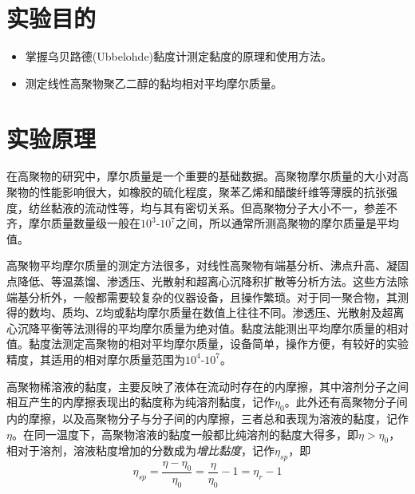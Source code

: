 \documentclass[12pt,hyperref,a4paper,UTF8]{ctexart}
\begin{document}
\cover

%
%

\thispagestyle{empty} %

\newpage
\tableofcontents

\newpage


\section{实验目的}
\begin{itemize}
    \item 掌握乌贝路德(Ubbelohde)黏度计测定黏度的原理和使用方法。
    \item 测定线性高聚物聚乙二醇的黏均相对平均摩尔质量。
\end{itemize}


\section{实验原理}
在高聚物的研究中，摩尔质量是一个重要的基础数据。高聚物摩尔质量的大小对高聚物的性能影响很大，如橡胶的硫化程度，聚苯乙烯和醋酸纤维等薄膜的抗张强度，纺丝黏液的流动性等，均与其有密切关系。但高聚物分子大小不一，参差不齐，摩尔质量数量级一般在$10^3$-$10^7$之间，所以通常所测高聚物的摩尔质量是平均值。

高聚物平均摩尔质量的测定方法很多，对线性高聚物有端基分析、沸点升高、凝固点降低、等温蒸馏、渗透压、光散射和超离心沉降积扩散等分析方法。这些方法除端基分析外，一般都需要较复杂的仪器设备，且操作繁琐。对于同一聚合物，其测得的数均、质均、Z均或黏均摩尔质量在数值上往往不同。渗透压、光散射及超离心沉降平衡等法测得的平均摩尔质量为绝对值。黏度法能测出平均摩尔质量的相对值。黏度法测定高聚物的相对平均摩尔质量，设备简单，操作方便，有较好的实验精度，其适用的相对摩尔质量范围为$10^4$-$10^7$。

高聚物稀溶液的黏度，主要反映了液体在流动时存在的内摩擦，其中溶剂分子之间相互产生的内摩擦表现出的黏度称为纯溶剂黏度，记作$\eta _0$。此外还有高聚物分子间内的摩擦，以及高聚物分子与分子间的内摩擦，三者总和表现为溶液的黏度，记作$\eta$。在同一温度下，高聚物溶液的黏度一般都比纯溶剂的黏度大得多，即$\eta > \eta_0$，相对于溶剂，溶液粘度增加的分数成为\textit{增比黏度}，记作$\eta _{sp}$，即
\begin{equation}
    \eta _ {sp} = \frac{\eta - \eta_0}{\eta_0} = \frac{\eta}{\eta _0} -1 = \eta _r -1
\end{equation}
\end{document}
